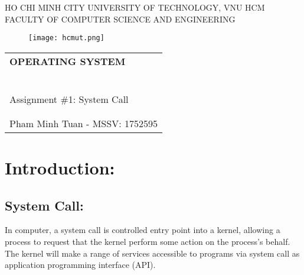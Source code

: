 \documentclass[a4paper, 11pt]{article}
\begin{document}
    \begin{titlepage}
        \begin{center}
            HO CHI MINH CITY UNIVERSITY OF TECHNOLOGY, VNU HCM \\
            FACULTY OF COMPUTER SCIENCE AND ENGINEERING
        \end{center}

        \vspace{1cm}

        \begin{figure}[h!]
            \begin{center}
                \texttt{[image: hcmut.png]}
            \end{center}
        \end{figure}

        \vspace{1cm}

        \begin{center}
            \begin{tabular}{c}
                \multicolumn{1}{l}{\textbf{\LARGE OPERATING SYSTEM}} \\
                ~~\\
                \hline
                \\
                \multicolumn{1}{l}{\LARGE Assignment \#1: System Call} \\
                \\
                \hline
                \\
                \hspace{5cm} Pham Minh Tuan - MSSV: 1752595
            \end{tabular}
        \end{center}
    \end{titlepage}

\newpage

\renewcommand*\contentsname{Contents:}
\tableofcontents

\newpage
\section{Introduction:}
\subsection{System Call:}

\par{In computer, a system call is controlled entry point into a kernel, allowing a process to request that the kernel perform some action on the process's behalf. The kernel will make a range of services accessible to programs via system call as application programming interface (API)}.
\end{document}
